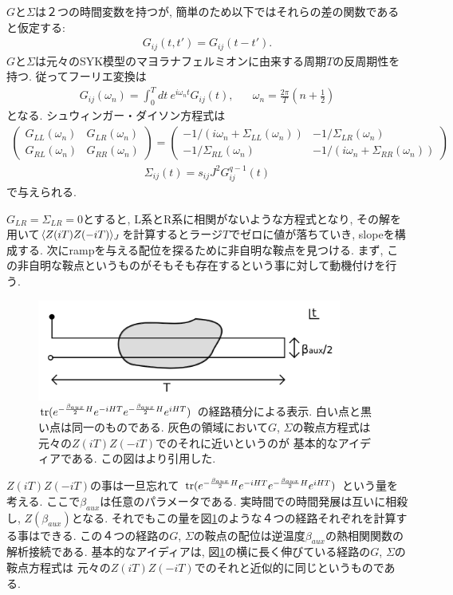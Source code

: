 $G$と$\Sigma$は２つの時間変数を持つが, 簡単のため以下ではそれらの差の関数であると仮定する:
\begin{align}
	G_{ij}(t, t') = G_{ij}(t - t').
\end{align}
$G$と$\Sigma$は元々のSYK模型のマヨラナフェルミオンに由来する周期$T$の反周期性を持つ. 
従ってフーリエ変換は
\begin{align}
	G_{ij}(\omega_n) = \int_0^T dt\ e^{i\omega_nt}G_{ij}(t),
	\hspace{20pt}\omega_n = \frac{2\pi}{T}\left(n + \frac{1}{2}\right)
\end{align}
となる. 
シュウィンガー・ダイソン方程式は
\begin{align}
	\begin{pmatrix}
		G_{LL}(\omega_n) & G_{LR}(\omega_n)\\
		G_{RL}(\omega_n) & G_{RR}(\omega_n)
	\end{pmatrix}
	=
	\begin{pmatrix}
		-1/(i\omega_n + \Sigma_{LL}(\omega_n)) & -1/\Sigma_{LR}(\omega_n)\\
		-1/\Sigma_{RL}(\omega_n) & -1/(i\omega_n + \Sigma_{RR}(\omega_n))
	\end{pmatrix}
	\label{eq:replica_SDeq_1}
\end{align}
\begin{align}
	\Sigma_{ij}(t) = s_{ij}J^2G_{ij}^{q-1}(t)
	\label{eq:replica_SDeq_2}
\end{align}
で与えられる. 

$G_{LR} = \Sigma_{LR} = 0$とすると, L系とR系に相関がないような方程式となり, 
その解を用いて$\langle Z(iT)Z(-iT) \rangle_J$を計算するとラージ$T$でゼロに値が落ちていき, 
slopeを構成する. 
次にrampを与える配位を探るために非自明な鞍点を見つける. 
まず, この非自明な鞍点というものがそもそも存在するという事に対して動機付けを行う. 

\begin{figure}[ht]
	\centering
	\includegraphics[width=10cm]{figures/beta_aux}
	\caption{$\mathrm{tr}(e^{-\frac{\beta_{aux}}{2}H}e^{-iHT}e^{-\frac{\beta_{aux}}{2}H}e^{iHT})$
		の経路積分による表示. 白い点と黒い点は同一のものである. 
		灰色の領域において$G$, $\Sigma$の鞍点方程式は元々の$Z(iT)Z(-iT)$でのそれに近いというのが
		基本的なアイディアである. この図は\cite{stanford_chaos}より引用した.
	}
	\label{fig:beta_aux}
\end{figure}
$Z(iT)Z(-iT)$の事は一旦忘れて
$\mathrm{tr}(e^{-\frac{\beta_{aux}}{2}H}e^{-iHT}e^{-\frac{\beta_{aux}}{2}H}e^{iHT})$
という量を考える. ここで$\beta_{aux}$は任意のパラメータである. 
実時間での時間発展は互いに相殺し, $Z(\beta_{aux})$となる. 
それでもこの量を図\ref{fig:beta_aux}のような４つの経路それぞれを計算する事はできる. 
この４つの経路の$G$, $\Sigma$の鞍点の配位は逆温度$\beta_{aux}$の熱相関関数の解析接続である. 
基本的なアイディアは, 図\ref{fig:beta_aux}の横に長く伸びている経路の$G$, $\Sigma$の鞍点方程式は
元々の$Z(iT)Z(-iT)$でのそれと近似的に同じというものである. 

